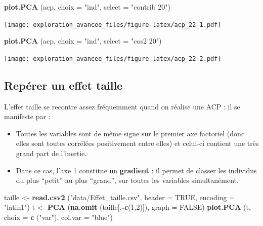 \documentclass[]{book}
\newenvironment{Shaded}{\begin{snugshade}}{\end{snugshade}}
\newcommand{\DataTypeTok}[1]{\textcolor[rgb]{0.13,0.29,0.53}{#1}}
\newcommand{\DecValTok}[1]{\textcolor[rgb]{0.00,0.00,0.81}{#1}}
\newcommand{\KeywordTok}[1]{\textcolor[rgb]{0.13,0.29,0.53}{\textbf{#1}}}
\newcommand{\NormalTok}[1]{#1}
\newcommand{\OperatorTok}[1]{\textcolor[rgb]{0.81,0.36,0.00}{\textbf{#1}}}
\newcommand{\OtherTok}[1]{\textcolor[rgb]{0.56,0.35,0.01}{#1}}
\newcommand{\StringTok}[1]{\textcolor[rgb]{0.31,0.60,0.02}{#1}}
\providecommand{\tightlist}{%
  \setlength{\itemsep}{0pt}\setlength{\parskip}{0pt}}
\begin{document}
\begin{Shaded}
\begin{Highlighting}[]
\KeywordTok{plot.PCA}\NormalTok{ (acp, }\DataTypeTok{choix =} \StringTok{"ind"}\NormalTok{, }\DataTypeTok{select =} \StringTok{"contrib 20"}\NormalTok{)}
\end{Highlighting}
\end{Shaded}

\texttt{[image: exploration\_avancee\_files/figure-latex/acp\_22-1.pdf]}

\begin{Shaded}
\begin{Highlighting}[]
\KeywordTok{plot.PCA}\NormalTok{ (acp, }\DataTypeTok{choix =} \StringTok{"ind"}\NormalTok{, }\DataTypeTok{select =} \StringTok{"cos2 20"}\NormalTok{)}
\end{Highlighting}
\end{Shaded}

\texttt{[image: exploration\_avancee\_files/figure-latex/acp\_22-2.pdf]}

\hypertarget{reperer-un-effet-taille}{%
\subsection{Repérer un effet taille}\label{reperer-un-effet-taille}}

L'effet taille se recontre assez fréquemment quand on réalise une ACP : il se manifeste par :

\begin{itemize}
\tightlist
\item
  Toutes les variables sont de même signe sur le premier axe factoriel (donc elles sont toutes corrélées positivement entre elles) et celui-ci contient une très grand part de l'inertie.
\item
  Dans ce cas, l'axe 1 constitue un \textbf{gradient} : il permet de classer les individus du plus ``petit'' au plus ``grand'', sur toutes les variables simultanément.
\end{itemize}

\begin{Shaded}
\begin{Highlighting}[]
\NormalTok{taille <-}\StringTok{ }\KeywordTok{read.csv2}\NormalTok{ (}\StringTok{"data/Effet_taille.csv"}\NormalTok{, }\DataTypeTok{header =} \OtherTok{TRUE}\NormalTok{,}
                     \DataTypeTok{encoding =} \StringTok{"latin1"}\NormalTok{)}
\NormalTok{t <-}\StringTok{ }\KeywordTok{PCA}\NormalTok{ (}\KeywordTok{na.omit}\NormalTok{ (taille[,}\OperatorTok{-}\KeywordTok{c}\NormalTok{(}\DecValTok{1}\NormalTok{,}\DecValTok{2}\NormalTok{)]), }\DataTypeTok{graph =} \OtherTok{FALSE}\NormalTok{)}
\KeywordTok{plot.PCA}\NormalTok{ (t, }\DataTypeTok{choix =} \KeywordTok{c}\NormalTok{ (}\StringTok{"var"}\NormalTok{), }\DataTypeTok{col.var =} \StringTok{"blue"}\NormalTok{)}
\end{Highlighting}
\end{Shaded}
\end{document}
